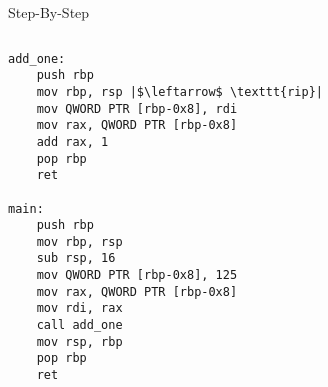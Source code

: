 \documentclass[hyphens,aspectratio=169]{beamer}
\begin{document}
\begin{frame}[fragile]{Step-By-Step}
    \begin{columns}
        \begin{column}{0.33\textwidth}
            \begin{verbatim}
add_one:
    push rbp
    mov rbp, rsp |$\leftarrow$ \texttt{rip}|
    mov QWORD PTR [rbp-0x8], rdi
    mov rax, QWORD PTR [rbp-0x8]
    add rax, 1
    pop rbp
    ret

main:
    push rbp
    mov rbp, rsp
    sub rsp, 16
    mov QWORD PTR [rbp-0x8], 125
    mov rax, QWORD PTR [rbp-0x8]
    mov rdi, rax
    call add_one
    mov rsp, rbp
    pop rbp
    ret
            \end{verbatim}
        \end{column}
        \begin{column}{0.33\textwidth}
\end{column}
\end{columns}
\end{frame}
\end{document}
